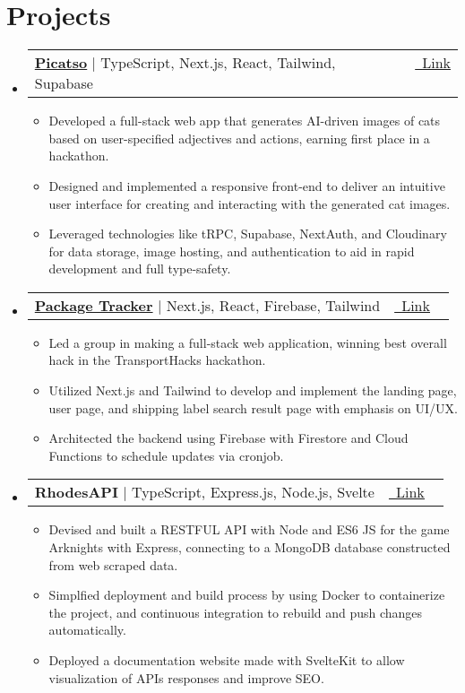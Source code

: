 \documentclass[letterpaper,11pt]{article}
\makeatletter
\newcommand{\resumeItem}[1]{
  \item\small{
    {#1 \vspace{-2pt}}
  }
}
\newcommand{\resumeProjectHeading}[2]{
    \item
    \begin{tabular*}{0.97\textwidth}{l@{\extracolsep{\fill}}r}
      \small#1 & #2 \\
    \end{tabular*}\vspace{-7pt}
}
\newcommand{\resumeSubHeadingListStart}{\begin{itemize}[leftmargin=0.15in, label={}]}
\newcommand{\resumeSubHeadingListEnd}{\end{itemize}}
\newcommand{\resumeItemListStart}{\begin{itemize}}
\newcommand{\resumeItemListEnd}{\end{itemize}\vspace{-5pt}}
\makeatother
\begin{document}
\section{Projects}
    \vspace{-5pt}
    \resumeSubHeadingListStart
        \resumeProjectHeading
          {\textbf{\href{https://picatso.vercel.app/}{Picatso}} $|$ {TypeScript, Next.js, React, Tailwind, Supabase}}{\vspace{3pt} \href{https://picatso.vercel.app/}{\raisebox{-0.2\height}\ \underline{Link}} ~}
          \resumeItemListStart
            \resumeItem{Developed a full-stack web app that generates AI-driven images of cats based on user-specified adjectives and actions, earning first place in a hackathon.}
            \vspace{2pt}
            \resumeItem{Designed and implemented a responsive front-end to deliver an intuitive user interface for creating and interacting with the generated cat images. }
            \vspace{2pt}
            \resumeItem{Leveraged technologies like tRPC, Supabase, NextAuth, and Cloudinary for data storage, image hosting, and authentication to aid in rapid development and full type-safety.}
          \resumeItemListEnd
        \resumeProjectHeading
          {\textbf{\href{https://packagetracker.tech}{Package Tracker}} $|$ {Next.js, React, Firebase, Tailwind}}{\vspace{3pt} \href{https://packagetracker.tech}{\raisebox{-0.2\height}\ \underline{Link}} ~}
          \resumeItemListStart
            \resumeItem{Led a group in making a full-stack web application, winning best overall hack in the TransportHacks hackathon.}
            \vspace{2pt}
            \resumeItem{ Utilized Next.js and Tailwind to develop and implement the landing page, user page, and shipping label search result page with emphasis on UI/UX. }
            \vspace{2pt}
            \resumeItem{Architected the backend using Firebase with Firestore and Cloud Functions to schedule updates via cronjob.}
        \resumeItemListEnd
        \resumeProjectHeading
          {\textbf{RhodesAPI} $|$ {TypeScript, Express.js, Node.js, Svelte}}{\vspace{3pt} \href{https://rhodesapi.com/}{\raisebox{-0.2\height}\ \underline{Link}} ~}
          \resumeItemListStart
            \resumeItem{Devised and built a RESTFUL API with Node and ES6 JS for the game Arknights with Express, connecting to a MongoDB database constructed from web scraped data.}
            \vspace{2pt}
            \resumeItem{Simplfied deployment and build process by using Docker to containerize the project, and continuous integration to
rebuild and push changes automatically.}
            \vspace{2pt}
            \resumeItem{Deployed a documentation website made with SvelteKit to allow visualization of APIs responses and improve SEO.}
          \resumeItemListEnd
    \resumeSubHeadingListEnd

\vspace{-2pt}

\end{document}
